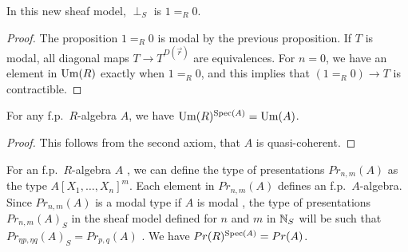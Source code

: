     \begin{proposition}
      In this new sheaf model, $\perp_S$ is $1 =_R 0$.
    \end{proposition}

    \begin{proof}
      The proposition $1=_R0$ is modal by the previous proposition.
      If $T$ is modal, all diagonal maps $T\rightarrow T^{D(\vec{r})}$ are equivalences. For $n = 0$, we have
      an element in $\mathrm{Um}(R)$ exactly when $1=_R0$, and this implies that $(1=_R0)\rightarrow T$ is contractible.
    \end{proof}
    
    \begin{lemma}\label{Um}
      For any f.p.\ $R$-algebra $A$, we have $\mathrm{Um}(R)^{\operatorname{Spec}(A)} = \mathrm{Um}(A)$.
    \end{lemma}

    \begin{proof}
      This follows from the second axiom, that $A$ is quasi-coherent.
    \end{proof}




    
    For an f.p.\ $R$-algebra $A$ , we can define the type of presentations $Pr_{n,m}(A)$ as the type $A[X_1,\dots,X_n]^m$. Each element in $Pr_{n,m}(A)$ defines an
    f.p.\ $A$-algebra. Since $Pr_{n,m}(A)$ is a modal type if $A$ is modal , the type of presentations $Pr_{n,m}(A)_S$ in the sheaf model
    defined for $n$ and $m$ in $\mathbb{N}_S$ will be such that $Pr_{\eta p,\eta q}(A)_S = Pr_{p,q}(A)$ \cite{CRS21}.
    We have $Pr(R)^{\operatorname{Spec}(A)} = Pr(A)$. 
    
